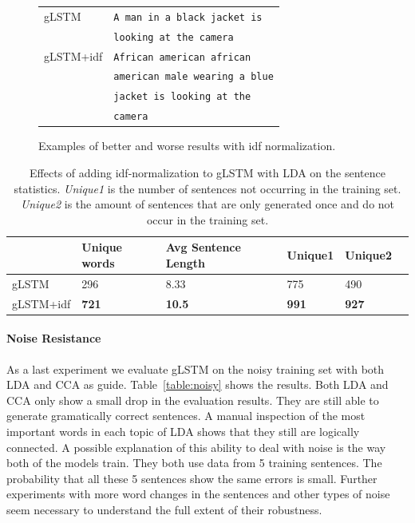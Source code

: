 \documentclass[twoside,twocolumn]{article}
\begin{document}
\begin{figure}
\begin{minipage}[t]{.45\textwidth}
		\end{minipage}\hfill
		\begin{minipage}[t]{.7\textwidth}
			\vspace{0pt}
			\begin{tabular}{ll}
				gLSTM & \texttt{A man in a black jacket is} \\ 
				~ & \texttt{looking at the camera} \\
				gLSTM+idf & \texttt{African american african}\\
				~ & \texttt{american male wearing a blue} \\
				~ & \texttt{jacket is looking at the} \\
				~ & \texttt{camera} \\
			\end{tabular}
		\end{minipage}
		\caption{Examples of better and worse results with idf normalization.}
		\label{fig:idf}
	\end{figure}
	
	\begin{table}
		\centering
		\begin{tabular}{llllll}
			~                   & Unique words& Avg Sentence Length & Unique1 & Unique2 \\ \hline
			gLSTM                         & 296   & 8.33   & 775   & 490  \\
			
			gLSTM+idf                 & \textbf{721}   & \textbf{10.5}   & \textbf{991}   & \textbf{927}    \\\hline
		\end{tabular}
		\caption{Effects of adding idf-normalization to gLSTM with LDA on the sentence statistics. \emph{Unique1} is the number of sentences not occurring in the training set. \emph{Unique2} is the amount of sentences that are only generated once and do not occur in the training set.}
		\label{table:idf-stats}
	\end{table}
	
	\paragraph{Noise Resistance}
	As a last experiment we evaluate gLSTM on the noisy training set with both LDA and CCA as guide.
	Table~\ref{table:noisy} shows the results. Both LDA and CCA only show a small drop in the evaluation results. They are still able to generate gramatically correct sentences. A manual inspection of the most important words in each topic of LDA shows that they still are logically connected. A possible explanation of this ability to deal with noise is the way both of the models train. They both use data from 5 training sentences. The probability that all these 5 sentences show the same errors is small. Further experiments with more word changes in the sentences and other types of noise seem necessary to understand the full extent of their robustness.
	
\end{document}
